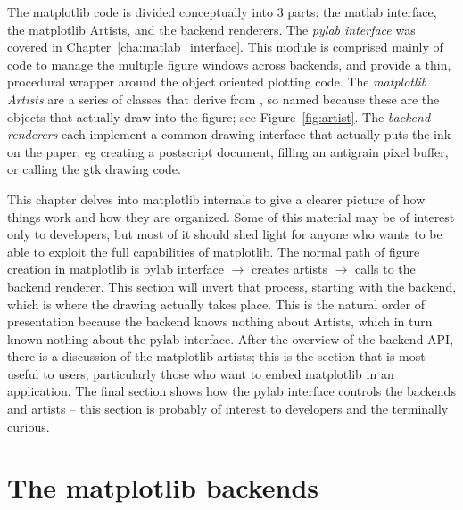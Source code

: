 \documentclass[twoside]{book}
\begin{document}
The matplotlib code is divided conceptually into 3 parts: the matlab
interface, the matplotlib Artists, and the backend renderers.  The
\textit{pylab interface} was covered in
Chapter~\ref{cha:matlab_interface}.  This module
 is comprised mainly of code to manage the
multiple figure windows across backends, and provide a thin,
procedural wrapper around the object oriented plotting code.  The
\textit{matplotlib Artists} are a series of classes that derive from
, so named because these are the
objects that actually draw into the figure; see
Figure~\ref{fig:artist}.  The \textit{backend renderers} each
implement a common drawing interface that actually puts the ink on the
paper, eg creating a postscript document, filling an antigrain pixel
buffer, or calling the gtk drawing code.

This chapter delves into matplotlib internals to give a clearer
picture of how things work and how they are organized.  Some of this
material may be of interest only to developers, but most of it should
shed light for anyone who wants to be able to exploit the full
capabilities of matplotlib.  The normal path of figure creation in
matplotlib is pylab interface $\rightarrow$ creates artists
$\rightarrow$ calls to the backend renderer.  This section will invert
that process, starting with the backend, which is where the drawing
actually takes place.  This is the natural order of presentation
because the backend knows nothing about Artists, which in turn known
nothing about the pylab interface.  After the overview of the backend
API, there is a discussion of the matplotlib artists; this is the
section that is most useful to users, particularly those who want to
embed matplotlib in an application.  The final section shows how the
pylab interface controls the backends and artists -- this section is
probably of interest to developers and the terminally curious.

\section{The matplotlib backends}
\label{sec:api_backends}
\end{document}
